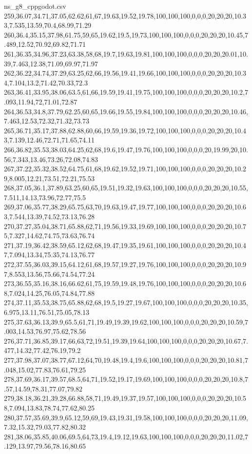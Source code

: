 \begin{filecontents*}[overwrite]{ns_g8_cppgodot.csv}
259,36.07,34.71,37.05,62.62,61,67,19.63,19.52,19.78,100,100,100,0,0,0,20,20,20,10.33,7.535,13.59,70.4,68.99,71.29
260,36.4,35.15,37.98,61.75,59,65,19.62,19.5,19.73,100,100,100,0,0,0,20,20,20,10.45,7.489,12.52,70.92,69.82,71.71
261,36.35,34.96,37.23,63.38,58,68,19.7,19.63,19.81,100,100,100,0,0,0,20,20,20.01,10.39,7.463,12.38,71.09,69.97,71.97
262,36.22,34.74,37.29,63.25,62,66,19.56,19.41,19.66,100,100,100,0,0,0,20,20,20,10.34,7.104,13.2,71.42,70.33,72.3
263,36.41,33.95,38.06,63.5,61,66,19.59,19.41,19.75,100,100,100,0,0,0,20,20,20,10.2,7.093,11.94,72,71.01,72.87
264,36.53,34.8,37.79,62.25,60,65,19.66,19.55,19.84,100,100,100,0,0,0,20,20,20,10.46,7.463,12.53,72.32,71.32,73.73
265,36.71,35.17,37.88,62.88,60,66,19.59,19.36,19.72,100,100,100,0,0,0,20,20,20,10.43,7.139,12.46,72.71,71.65,74.11
266,36.82,35.53,38.03,64.25,62,68,19.6,19.47,19.76,100,100,100,0,0,0,20,19.99,20,10.56,7.343,13.46,73.26,72.08,74.83
267,37.22,35.32,38.52,64.75,61,68,19.62,19.52,19.71,100,100,100,0,0,0,20,20,20,10.29,8.005,12.21,73.51,72.21,75.53
268,37.05,36.1,37.89,63.25,60,65,19.51,19.32,19.63,100,100,100,0,0,0,20,20,20,10.55,7.511,14.13,73.96,72.77,75.5
269,37.06,35.77,38.29,65.75,63,70,19.63,19.47,19.77,100,100,100,0,0,0,20,20,20,10.63,7.544,13.39,74.52,73.13,76.28
270,37.27,35.04,38.71,65.88,62,71,19.56,19.33,19.69,100,100,100,0,0,0,20,20,20,10.75,7.327,14.62,74.75,73.63,76.74
271,37.19,36.42,38.59,65.12,62,68,19.47,19.35,19.61,100,100,100,0,0,0,20,20,20,10.47,7.094,13.34,75.35,74.13,76.77
272,37.55,36.03,39.15,64.12,61,68,19.57,19.27,19.76,100,100,100,0,0,0,20,20,20,10.97,8.553,13.56,75.66,74.54,77.24
273,36.55,35.16,38.16,66.62,61,75,19.59,19.48,19.76,100,100,100,0,0,0,20,20,20,10.68,7.024,14.25,76.05,74.84,77.88
274,37.11,35.53,38.75,65.88,62,68,19.5,19.27,19.67,100,100,100,0,0,0,20,20,20,10.35,6.975,13.11,76.51,75.05,78.13
275,37.63,36.13,39.9,65.5,61,71,19.49,19.39,19.62,100,100,100,0,0,0,20,20,20,10.59,7.003,14.53,76.97,75.62,78.56
276,37.71,36.85,39.17,66,63,72,19.51,19.39,19.64,100,100,100,0,0,0,20,20,20,10.67,7.477,14.32,77.42,76.19,79.2
277,37.98,37.07,38.77,67.12,64,70,19.48,19.4,19.6,100,100,100,0,0,0,20,20,20,10.81,7.048,15.02,77.83,76.61,79.25
278,37.69,36.17,39.57,68.5,64,71,19.52,19.17,19.69,100,100,100,0,0,0,20,20,20,10.8,7.57,14.59,78.31,77.07,79.82
279,38.18,36.21,39.28,66.88,58,71,19.49,19.37,19.57,100,100,100,0,0,0,20,20,20,10.58,7.094,13.83,78.74,77.62,80.25
280,37.57,35.69,39.9,65.12,59,69,19.43,19.31,19.58,100,100,100,0,0,0,20,20,20,11.09,7.32,15.32,79.03,77.82,80.32
281,38.06,35.85,40.06,69.5,64,73,19.4,19.12,19.63,100,100,100,0,0,0,20,20,20,11.02,7.129,13.97,79.56,78.16,80.65

\end{filecontents*}
